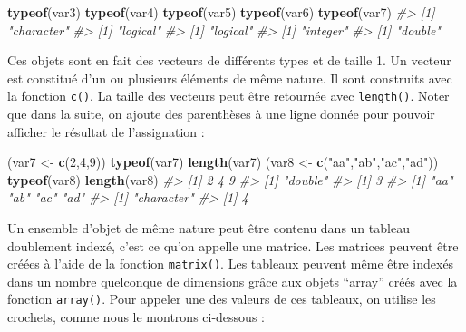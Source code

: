 \documentclass[]{article}
\newenvironment{Shaded}{\begin{snugshade}}{\end{snugshade}}
\newcommand{\CommentTok}[1]{\textcolor[rgb]{0.56,0.35,0.01}{\textit{#1}}}
\newcommand{\DecValTok}[1]{\textcolor[rgb]{0.00,0.00,0.81}{#1}}
\newcommand{\KeywordTok}[1]{\textcolor[rgb]{0.13,0.29,0.53}{\textbf{#1}}}
\newcommand{\NormalTok}[1]{#1}
\newcommand{\StringTok}[1]{\textcolor[rgb]{0.31,0.60,0.02}{#1}}
\begin{document}
\begin{Shaded}
\begin{Highlighting}[]
\KeywordTok{typeof}\NormalTok{(var3)}
\KeywordTok{typeof}\NormalTok{(var4)}
\KeywordTok{typeof}\NormalTok{(var5)}
\KeywordTok{typeof}\NormalTok{(var6)}
\KeywordTok{typeof}\NormalTok{(var7)}
\CommentTok{#> [1] "character"}
\CommentTok{#> [1] "logical"}
\CommentTok{#> [1] "logical"}
\CommentTok{#> [1] "integer"}
\CommentTok{#> [1] "double"}
\end{Highlighting}
\end{Shaded}

Ces objets sont en fait des vecteurs de différents types et de taille 1. Un
vecteur est constitué d'un ou plusieurs éléments de même nature. Il sont
construits avec la fonction \texttt{c()}. La taille des vecteurs peut être retournée
avec \texttt{length()}. Noter que dans la suite, on ajoute des parenthèses à une ligne
donnée pour pouvoir afficher le résultat de l'assignation :

\begin{Shaded}
\begin{Highlighting}[]
\NormalTok{(var7 <-}\StringTok{ }\KeywordTok{c}\NormalTok{(}\DecValTok{2}\NormalTok{,}\DecValTok{4}\NormalTok{,}\DecValTok{9}\NormalTok{))}
\KeywordTok{typeof}\NormalTok{(var7)}
\KeywordTok{length}\NormalTok{(var7)}
\NormalTok{(var8 <-}\StringTok{ }\KeywordTok{c}\NormalTok{(}\StringTok{"aa"}\NormalTok{,}\StringTok{"ab"}\NormalTok{,}\StringTok{"ac"}\NormalTok{,}\StringTok{"ad"}\NormalTok{))}
\KeywordTok{typeof}\NormalTok{(var8)}
\KeywordTok{length}\NormalTok{(var8)}
\CommentTok{#> [1] 2 4 9}
\CommentTok{#> [1] "double"}
\CommentTok{#> [1] 3}
\CommentTok{#> [1] "aa" "ab" "ac" "ad"}
\CommentTok{#> [1] "character"}
\CommentTok{#> [1] 4}
\end{Highlighting}
\end{Shaded}

Un ensemble d'objet de même nature peut être contenu dans un tableau doublement
indexé, c'est ce qu'on appelle une matrice. Les matrices peuvent être créées à
l'aide de la fonction \texttt{matrix()}. Les tableaux peuvent même être indexés dans un
nombre quelconque de dimensions grâce aux objets ``array'' créés avec la fonction
\texttt{array()}. Pour appeler une des valeurs de ces tableaux, on utilise les
crochets, comme nous le montrons ci-dessous :
\end{document}
